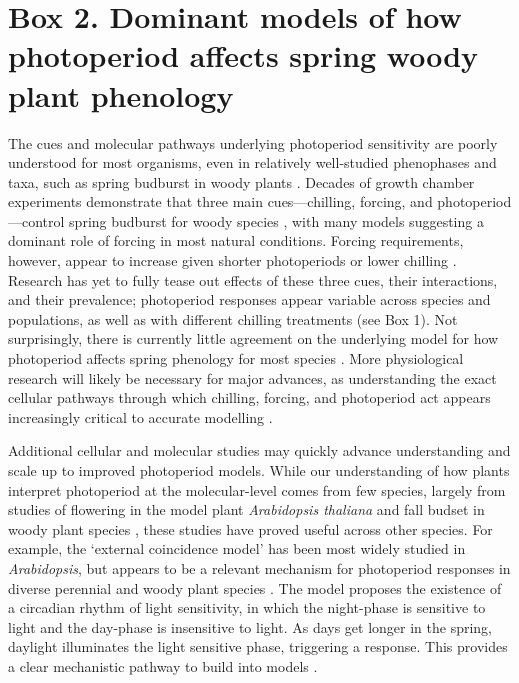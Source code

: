 \documentclass{article}
\begin{document}
\section*{Box 2. Dominant models of how photoperiod affects spring woody plant phenology}
\par The cues and molecular pathways underlying photoperiod sensitivity are poorly understood for most organisms, even in relatively well-studied phenophases and taxa, such as spring budburst in woody plants \citep{ding2016}. Decades of growth chamber experiments demonstrate that three main cues---chilling, forcing, and photoperiod---control spring budburst for woody species \citep{flynn2018, zohner2016,Heide:2008aa}, with many models suggesting a dominant role of forcing in most natural conditions. Forcing requirements, however, appear to increase given shorter photoperiods or lower chilling \citep{Caffarra:2011qf,chuine2010}. Research has yet to fully tease out effects of these three cues, their interactions, and their prevalence;  photoperiod responses appear variable across species and populations, as well as with different chilling treatments (see Box 1). Not surprisingly, there is currently little agreement on the underlying model for how photoperiod affects spring phenology for most species \citep{chuine2016,hanninen2019}. More physiological research will likely be necessary for major advances, as understanding the exact cellular pathways through which chilling, forcing, and photoperiod act appears increasingly critical to accurate modelling \citep{vanderschoot2014,hanninen2019}. 

\par Additional cellular and molecular studies may quickly advance understanding and scale up to improved photoperiod models. While our understanding of how plants interpret photoperiod at the molecular-level comes from few species, largely from studies of flowering in the model plant \emph{Arabidopsis thaliana} \citep[e.g.,][]{suarez2001} and fall budset in woody plant species \citep[e.g.,][]{Howe:1996}, these studies have proved useful across other species. For example, the `external coincidence model' \citep[where plants sense light via blue light receptors and phytochromes, then interpret photoperiod through a coordinated response to light in relation to the time of day, see][]{lagercrantz2009} has been most widely studied in \emph{Arabidopsis}, but appears to be a relevant mechanism for photoperiod responses in diverse perennial and woody plant species \citep{Singh:2017,petterle2013,andres2012,kobayashi2007,davis2002,bastow2002,bunning1936}. The model proposes the existence of a circadian rhythm of light sensitivity, in which the night-phase is sensitive to light and the day-phase is insensitive to light. As days get longer in the spring, daylight illuminates the light sensitive phase, triggering a response. This provides a clear mechanistic pathway to build into models \citep{Burghardt2015}. 
\end{document}
